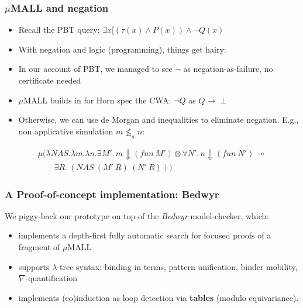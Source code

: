 \documentclass{beamer}
\newcommand{\red}[1]{{\color{red} #1}}
\begin{document}
\begin{frame}
  \frametitle{$\mu$MALL and negation}
  \begin{itemize}
  \item Recall the PBT query: $\exists x [(\tau(x)\land P(x)) \land \neg Q(x)$
  \item With \red{negation} and logic (programming), things get hairy:
  \item In our account of PBT, we managed to see $\neg$ as negation-as-failure, no certificate needed %
  \item $\mu$MALL builds in  for Horn spec the \red{CWA}:  $\neg Q$ as $Q\rightarrow\perp$
  \item Otherwise, we can use de Morgan and inequalities to \red{eliminate} negation. E.g., non applicative simulation $m \not\leq_a n$:
  \end{itemize}
  \begin{small}
   $$
\begin{array}{l}
 \mu(\lambda NAS.\lambda m.\lambda n.\exists M'.\,  m\Downarrow (fun\ M')
  \otimes
                         \forall N'.\, n\Downarrow (fun\ N') \multimap\mbox{}\\
  \qquad\exists R.\ ({NAS\ } (M' \ R) \  (N'\ R)))
\end{array}
$$
\end{small}
\end{frame}

\begin{frame}[fragile]
  \frametitle{A Proof-of-concept implementation: \textbf{Bedwyr}}
  We piggy-back our prototype on top of the \emph{Bedwyr} model-checker, which:
  \begin{itemize}
  \item implements a depth-first fully automatic search for focused proofs of a fragment of $\mu$MALL
  \item supports $\lambda$-tree syntax: binding in terms, pattern unification, binder mobility, $\nabla$-quantification
  \item implements (co)induction as loop detection via \textbf{tables} (modulo equivariance).
  \end{itemize}
\end{frame}
\end{document}
